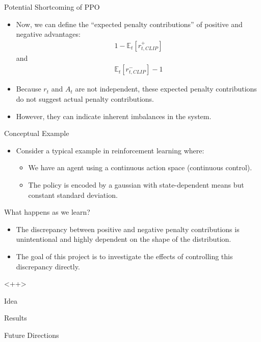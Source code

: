 \documentclass{beamer}
\begin{document}
\begin{frame}{Potential Shortcoming of PPO}
\begin{itemize}
        \framebreak
        \item Now, we can define the ``expected penalty contributions'' of
            positive and negative advantages:
        \begin{align*}
            1 - \mathbb{E}_t[r_{t, CLIP}^+]
        \end{align*}
        and
        \begin{align*}
            \mathbb{E}_t[r_{t, CLIP}^-] - 1
        \end{align*}
        \item Because $r_t$ and $A_t$ are not independent, these expected
            penalty contributions do not suggest actual penalty contributions.
        \item However, they can indicate inherent imbalances in the system.
    \end{itemize}
    \framebreak
    Conceptual Example
    \begin{itemize}
        \item Consider a typical example in reinforcement learning where:
            \begin{itemize}
                \item We have an agent using a continuous action
                    space (continuous control).
                \item The policy is encoded by a gaussian with state-dependent
                    means but constant standard deviation.
            \end{itemize}
    \end{itemize}
    \framebreak
    What happens as we learn?\\
    \begin{center}
    \end{center}
    \framebreak
    \begin{itemize}
        \item The discrepancy between positive and negative penalty
            contributions is unintentional and highly dependent on the shape of
            the distribution.
        \item The goal of this project is to investigate the effects of
            controlling this discrepancy directly.
    \end{itemize}<++>
\end{frame}

\begin{frame}{Idea}
\end{frame}

\begin{frame}{Results}
\end{frame}

\begin{frame}{Future Directions}
\end{frame}
\end{document}
